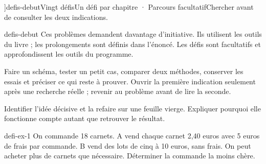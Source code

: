 \editionPage[\pdfbookmark[0]{Défis d’approfondissement}{bm-defis-debut-parent}]{defis-debut}{Vingt défis}{Un défi par chapitre · Parcours facultatif}{Chercher avant de consulter les deux indications.}
\begin{blocEdition}{defis-debut}
Ces problèmes demandent davantage d’initiative. Ils utilisent les outils du livre ; les prolongements sont définis dans l’énoncé. Les défis sont facultatifs et approfondissent les outils du programme.\par\bigskip
\begin{savoirfaire}Faire un schéma, tester un petit cas, comparer deux méthodes, conserver les essais et préciser ce qui reste à prouver. Ouvrir la première indication seulement après une recherche réelle ; revenir au problème avant de lire la seconde.\end{savoirfaire}
\begin{savoirfaire}Identifier l’idée décisive et la refaire sur une feuille vierge. Expliquer pourquoi elle fonctionne compte autant que retrouver le résultat.\end{savoirfaire}
\end{blocEdition}
\begin{blocEdition}{defi-ex-1}
On commande 18 carnets. A vend chaque carnet 2,40 euros avec 5 euros de frais par commande. B vend des lots de cinq à 10 euros, sans frais. On peut acheter plus de carnets que nécessaire. Déterminer la commande la moins chère.\par{}\par\par{}\par{}\par{}\par{}\par{}\par{}
\end{blocEdition}
